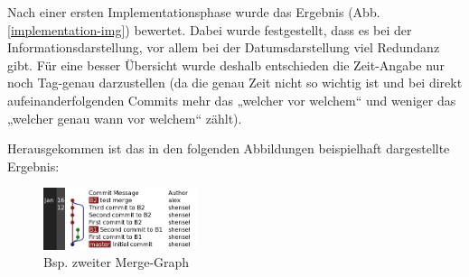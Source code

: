 \documentclass[color, ddc]{tudscrreprt}
\begin{document}
Nach einer ersten Implementationsphase wurde das Ergebnis (Abb. \ref{implementation-img}) bewertet. Dabei wurde festgestellt, dass es bei der Informationsdarstellung, vor allem bei der Datumsdarstellung viel Redundanz gibt. Für eine besser Übersicht wurde deshalb entschieden die Zeit-Angabe nur noch Tag-genau darzustellen (da die genau Zeit nicht so wichtig ist und bei direkt aufeinanderfolgenden Commits mehr das „welcher vor welchem“ und weniger das „welcher genau wann vor welchem“ zählt).

Herausgekommen ist das in den folgenden Abbildungen beispielhaft dargestellte Ergebnis:

\begin{figure}[ht!]
\begin{floatrow}

\end{floatrow}
\end{figure}

\begin{figure}[ht!]
\includegraphics[width=0.4\textwidth]{Skizzen/revisiongraph_http---test.com-r43ples-dataset-merging.png}
\caption{Bsp. zweiter Merge-Graph}
\label{imp-f3}
\end{figure}
\end{document}
